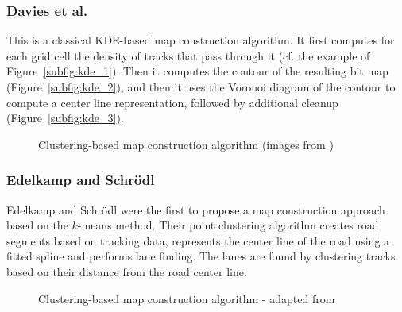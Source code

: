 \documentclass[natbib]{svjour3}                    \smartqed  \usepackage[table]{xcolor}
\begin{document}
\subsubsection{Davies et al. \protect\cite{Davies:2006:SDR:1175887.1176088}}
This is a classical KDE-based map construction algorithm. It first computes for each grid cell the density of tracks that pass through it (cf. the example of Figure~\ref{subfig:kde_1}). Then it computes the contour of the resulting bit map (Figure~\ref{subfig:kde_2}), and then it uses the Voronoi diagram of the contour to compute a center line representation, followed by additional cleanup (Figure~\ref{subfig:kde_3}).

\begin{figure}[htbp]
 \begin{center} 
 \end{center}
\caption{Clustering-based map construction algorithm (images from \cite{Davies:2006:SDR:1175887.1176088})}
\label{fig:kde}
\end{figure}


\subsubsection{Edelkamp and Schr\"odl \protect\cite{edelkamp:2003:rpmi}}

Edelkamp and Schr\"odl \cite{edelkamp:2003:rpmi} were the first to propose a map construction approach based on the $k$-means method. Their point clustering algorithm creates road segments based on tracking data, represents the center line of the road using a fitted spline and performs lane finding. The lanes are found by clustering tracks based on their distance from the road center line.

\begin{figure}[htbp]
 \begin{center} 
 \end{center}
\caption{Clustering-based map construction algorithm - adapted from \cite{edelkamp:2003:rpmi}}
\label{fig:edelkamp}
\end{figure}
 
\end{document}
